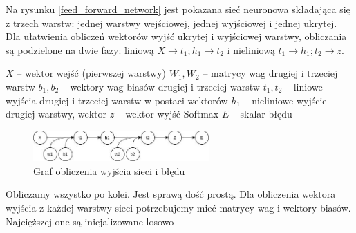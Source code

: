 \documentclass{article}
\begin{document}
Na rysunku \ref{feed_forward_network} jest pokazana sieć neuronowa składająca się z trzech warstw: jednej warstwy wejściowej, jednej wyjściowej i jednej ukrytej. Dla ułatwienia obliczeń wektorów wyjść ukrytej i wyjściowej warstwy, obliczania są podzielone na dwie fazy: liniową $X \rightarrow t_1; h_1 \rightarrow t_2$ i nieliniową $t_1 \rightarrow h_1; t_2 \rightarrow z$.

\begin{flushleft}
	$X$ -- wektor wejść (pierwszej warstwy) \newline
	$W_1, W_2$ -- matrycy wag drugiej i trzeciej warstw \newline
	$b_1, b_2$ -- wektory wag biasów drugiej i trzeciej warstw \newline
	$t_1, t_2$ -- liniowe wyjścia drugiej i trzeciej warstw w postaci wektorów\newline
	$h_1$ -- nieliniowe wyjście drugiej warstwy, wektor \newline
	$z$ -- wektor wyjść Softmax \newline
	$E$ -- skalar błędu
\end{flushleft}

\begin{figure}[H]
	\centering
	\includegraphics[width=0.6\textwidth,keepaspectratio=true]{feed_forward_graph}
	\caption{
		Graf obliczenia wyjścia sieci i błędu  
	}
	\label{feed_forward_graph}
\end{figure}


Obliczamy wszystko po kolei. Jest sprawą dość prostą. Dla obliczenia wektora wyjścia z każdej warstwy sieci potrzebujemy mieć matrycy wag i wektory biasów. Najcięższej one są inicjalizowane losowo
\end{document}
